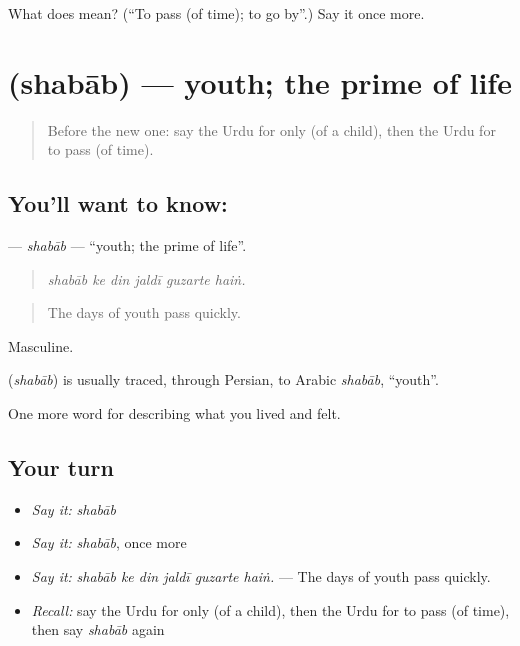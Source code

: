 \begin{tcolorbox}[breakable,colback=teal!4,colframe=teal!35!black,title={Before you move on}]
What does  mean? (\textquotedblleft{}To pass (of time); to go by\textquotedblright{}.) Say it once more.
\end{tcolorbox}
\section[\texorpdfstring{\ur{شباب} (shabāb)}{شباب (shabāb)}]{ (shabāb) — youth; the prime of life}

\label{lesson:UR-C486-shabab}



\begin{quote}
Before the new one: say the Urdu for only (of a child), then the Urdu for to pass (of time).
\end{quote}

\subsection*{You'll want to know: }
\textbf{} — \emph{shabāb} — \textquotedblleft{}youth; the prime of life\textquotedblright{}.

\begin{quote}
     
\end{quote}

\begin{quote}
\emph{shabāb ke din jaldī guzarte haiṅ.}
\end{quote}

\begin{quote}
The days of youth pass quickly.
\end{quote}

Masculine.

\begin{cousinweb}
\textbf{} (\emph{shabāb}) is usually traced, through Persian, to Arabic \emph{shabāb}, \textquotedblleft{}youth\textquotedblright{}.
\end{cousinweb}

\begin{grammarlens}[title={What you've built}]
One more word for describing what you lived and felt.
\end{grammarlens}

\subsection*{Your turn}
\begin{itemize}
\raggedright
  \item \emph{Say it:} \emph{shabāb}
  \item \emph{Say it:} \emph{shabāb}, once more
  \item \emph{Say it:} \emph{shabāb ke din jaldī guzarte haiṅ.} — The days of youth pass quickly.
  \item \emph{Recall:} say the Urdu for only (of a child), then the Urdu for to pass (of time), then say \emph{shabāb} again
\end{itemize}

